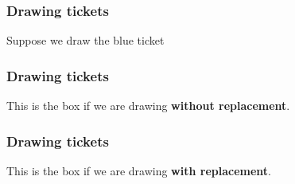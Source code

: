 \documentclass[handout]{beamer}
\begin{document}
   \begin{frame}
   \frametitle{Drawing tickets}
   \begin{center}
   \end{center}
   Suppose we draw the {\color{blue} blue ticket}
   \end{frame}



   \begin{frame}
   \frametitle{Drawing tickets}
   \begin{center}
   \end{center}
   This is the box if we are drawing {\bf without replacement}.
   \end{frame}



   \begin{frame}
   \frametitle{Drawing tickets}
   \begin{center}
   \end{center}
   This is the box if we are drawing {\bf with replacement}.
   \end{frame}
\end{document}
